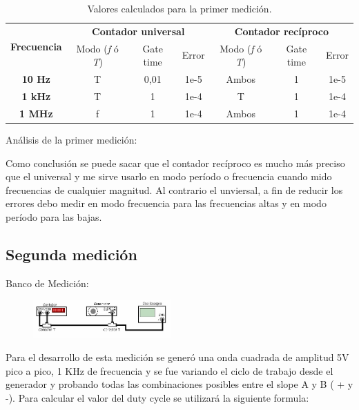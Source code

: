\documentclass{article}
\begin{document}
\begin{table}[!hbt]
	\begin{center}

		\begin{tabular}{|c|c|c|c|c|c|c|} \hline
			\multirow{2}{*}{\textbf{Frecuencia}}
			& \multicolumn{3}{c|}{\textbf{Contador universal}} & \multicolumn{3}{c|}{\textbf{Contador recíproco}} \\\cline{2-7}
			& Modo (\textit{f} ó \textit{T}) & Gate time & Error & Modo (\textit{f} ó \textit{T}) & Gate time & Error \\\hline
			
			\textbf{10 Hz} & T & 0,01 & 1e-5 & Ambos & 1 & 1e-5 \\\hline
			\textbf{1 kHz} & T & 1 & 1e-4 & T & 1 & 1e-4 \\\hline
			\textbf{1 MHz} & f & 1 & 1e-4 & Ambos & 1 & 1e-4 \\\hline
		\end{tabular}

	\caption{Valores calculados para la primer medición.}
	\end{center}
\end{table}
\medskip

Análisis de la primer medición:
		
		Como conclusión se puede sacar que el contador recíproco es mucho más preciso que el universal y me sirve usarlo en modo período o frecuencia cuando mido frecuencias de cualquier magnitud. Al contrario el unviersal, a fin de reducir los errores debo medir en modo frecuencia para las frecuencias altas y en modo período para las bajas.



\subsection{Segunda medición}

	Banco de Medición:
	
	\begin{figure}[h]
				\centering
				\includegraphics[width=0.47\textwidth]{images/bancoMedicionMed2.jpg}
				\medskip
	\end{figure}
	\bigskip\bigskip
	
	Para el desarrollo de esta medición se generó una onda cuadrada de amplitud 5V pico a pico, 1 KHz de frecuencia y se fue variando el ciclo de trabajo desde el generador y probando todas las combinaciones posibles entre el slope A y B ( + y -). Para calcular el valor del duty cycle se utilizará la siguiente formula:
			
\end{document}
